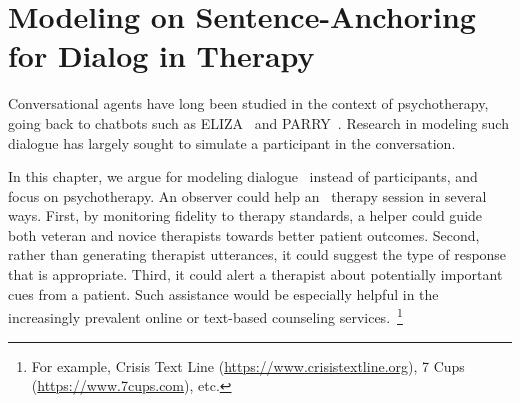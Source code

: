 \chapter{Modeling on Sentence-Anchoring for Dialog in Therapy}
\label{chap:snt}

Conversational agents have long been studied in the context of
psychotherapy, going back to chatbots such as
ELIZA~\citep{weizenbaum1966eliza} and
PARRY~\citep{colby1975artificial}. Research in modeling such dialogue
has largely sought to simulate a participant in the conversation.

In this chapter, we argue for modeling dialogue~
instead of participants, and focus on psychotherapy. An observer
could help an~ therapy session in several ways.
First, by monitoring fidelity to therapy standards, a helper could
guide both veteran and novice therapists towards better patient
outcomes. Second, rather than generating therapist utterances, it
could suggest the type of response that is appropriate. Third, it
could alert a therapist about potentially important cues from a
patient.
%
Such assistance would be especially helpful in the increasingly
prevalent online or text-based counseling services.~\footnote{For
  example, Crisis Text Line (\url{https://www.crisistextline.org}),
  7 Cups (\url{https://www.7cups.com}), etc.}

